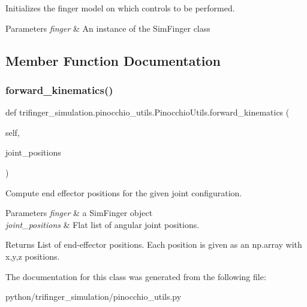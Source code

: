Initializes the finger model on which control\textquotesingle{}s to be performed. 


\begin{DoxyParams}{Parameters}
{\em finger} & An instance of the Sim\+Finger class \\
\hline
\end{DoxyParams}


\subsection{Member Function Documentation}
\mbox{\label{classtrifinger__simulation_1_1pinocchio__utils_1_1PinocchioUtils_a8bc685bf062c9fd89f29fe55081a693c}} 
\subsubsection{\texorpdfstring{forward\+\_\+kinematics()}{forward\_kinematics()}}
{\footnotesize\ttfamily def trifinger\+\_\+simulation.\+pinocchio\+\_\+utils.\+Pinocchio\+Utils.\+forward\+\_\+kinematics (\begin{DoxyParamCaption}\item[{}]{self,  }\item[{}]{joint\+\_\+positions }\end{DoxyParamCaption})}



Compute end effector positions for the given joint configuration. 


\begin{DoxyParams}{Parameters}
{\em finger} & a Sim\+Finger object \\
\hline
{\em joint\+\_\+positions} & Flat list of angular joint positions.\\
\hline
\end{DoxyParams}
\begin{DoxyReturn}{Returns}
List of end-\/effector positions. Each position is given as an np.\+array with x,y,z positions. 
\end{DoxyReturn}


The documentation for this class was generated from the following file\+:\begin{DoxyCompactItemize}
\item 
python/trifinger\+\_\+simulation/pinocchio\+\_\+utils.\+py\end{DoxyCompactItemize}

